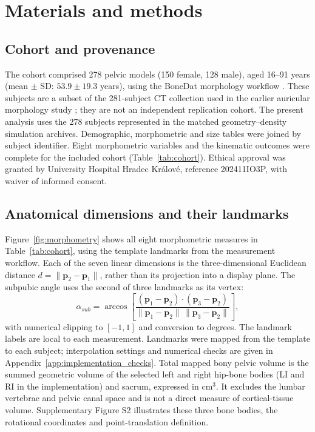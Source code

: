 \section{Materials and methods}
\subsection{Cohort and provenance}
The cohort comprised 278 pelvic models (150 female, 128 male), aged 16--91 years (mean $\pm$ SD: $53.9\pm19.3$ years), using the BoneDat morphology workflow \citep{HenyssKuchar2025BoneDat}. These subjects are a subset of the 281-subject CT collection used in the earlier auricular morphology study \citep{HenysHammer2025}; they are not an independent replication cohort. The present analysis uses the 278 subjects represented in the matched geometry--density simulation archives. Demographic, morphometric and size tables were joined by subject identifier. Eight morphometric variables and the kinematic outcomes were complete for the included cohort (Table~\ref{tab:cohort}). Ethical approval was granted by University Hospital Hradec Kr\'alov\'e, reference 202411IO3P, with waiver of informed consent.
\begin{table}[htbp]
\centering
\caption{Demographic and morphometric characteristics. Values are mean $\pm$ SD; linear dimensions and the subpubic angle are measured from mapped landmarks. Bony pelvic volume sums the selected left and right hip-bone bodies and sacrum.}
\label{tab:cohort}
\end{table}

\subsection{Anatomical dimensions and their landmarks}
Figure~\ref{fig:morphometry} shows all eight morphometric measures in Table~\ref{tab:cohort}, using the template landmarks from the measurement workflow. Each of the seven linear dimensions is the three-dimensional Euclidean distance $d=\|\mathbf p_2-\mathbf p_1\|$, rather than its projection into a display plane. The subpubic angle uses the second of three landmarks as its vertex:
\begin{equation}
\alpha_{sub}=\arccos\!\left[\frac{(\mathbf p_1-\mathbf p_2)\cdot(\mathbf p_3-\mathbf p_2)}{\|\mathbf p_1-\mathbf p_2\|\,\|\mathbf p_3-\mathbf p_2\|}\right],
\end{equation}
with numerical clipping to $[-1,1]$ and conversion to degrees. The landmark labels are local to each measurement. Landmarks were mapped from the template to each subject; interpolation settings and numerical checks are given in Appendix~\ref{app:implementation_checks}. Total mapped bony pelvic volume is the summed geometric volume of the selected left and right hip-bone bodies (LI and RI in the implementation) and sacrum, expressed in cm$^3$. It excludes the lumbar vertebrae and pelvic canal space and is not a direct measure of cortical-tissue volume. Supplementary Figure S2 illustrates these three bone bodies, the rotational coordinates and point-translation definition.

